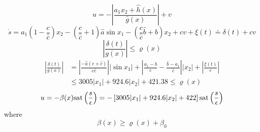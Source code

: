 \begin{equation}
        u = -\left \vert \frac{a_1 x_2 + \hat{h}(x)}{\hat{g}(x)} \right\vert + v
\end{equation}
\begin{equation}
        \dot{s} = a_1\left(1 - \frac{c}{\hat{c}}\right) x_2 - \left(\frac{c}{\hat{c}} + 1\right)\hat{a} \sin x_1 - \left(\frac{c}{\hat{c}}\hat{b} + b\right) x_2 + cv + \xi(t) \doteq \delta(t) + cv
\end{equation}
\begin{equation}
        \left \vert \frac{\delta(t)}{g(x)} \right\vert \leq \varrho(x)
\end{equation}
\begin{equation}
\begin{split}
        \left \vert \frac{\delta(t)}{g(x)} \right\vert &= \left \vert \frac{-\hat{a}(c+\hat{c})}{c\hat{c}} \right \vert \vert \sin x_1 \vert + \left \vert \frac{a_1 - b}{c} - \frac{\hat{b} - a_1}{\hat{c}} \right \vert \vert x_2 \vert + \left\vert \frac{\xi(t)}{c}\right\vert \\
        &\leq 3005 \vert x_1 \vert + 924.6\vert x_2 \vert + 421.38  \leq \varrho(x)
\end{split}
\end{equation}
\begin{equation}
        u = -\beta(x)\mathrm{sat}\left(\frac{s}{\epsilon}\right) =  -\left[ 3005 \vert x_1 \vert + 924.6\vert x_2 \vert + 422 \right]\mathrm{sat}\left(\frac{s}{\epsilon}\right)
\end{equation}
where
\begin{equation}
        \beta(x) \geq \varrho(x) + \beta_0
\end{equation}